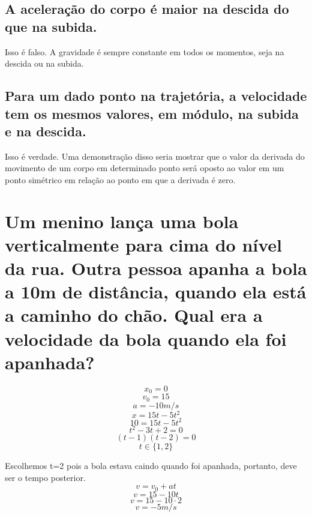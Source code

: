 \documentclass{article}
\begin{document}
    \subsection{A aceleração do corpo é maior na descida do que na subida.}
    \hspace{\parindent}Isso é falso. A gravidade é sempre constante em todos os momentos, seja na descida ou na subida.
    \subsection{Para um dado ponto na trajetória, a velocidade tem os mesmos valores, em módulo, na subida e na descida.}
    \hspace{\parindent}Isso é verdade. Uma demonstração disso seria mostrar que o valor da derivada do movimento de um corpo em determinado ponto será oposto ao valor em um ponto simétrico em relação ao ponto em que a derivada é zero.

\section{Um menino lança uma bola verticalmente para cima do nível da rua. Outra pessoa apanha a bola a 10m de distância, quando ela está a caminho do chão. Qual era a velocidade da bola quando ela foi apanhada?}
    \[x_0=0\]
    \[v_0=15\]
    \[a=-10m/s\]
    \[x=15t-5t^2\]
    \[10=15t-5t^2\]
    \[t^2-3t+2=0\]
    \[(t-1)(t-2)=0\]
    \[t\in\{1,2\}\]
    \par Escolhemos t=2 pois a bola estava caindo quando foi apanhada, portanto, deve ser o tempo posterior.
    \[v=v_0+at\]
    \[v=15-10t\]
    \[v=15-10\cdot 2\]
    \[v=-5m/s\]
    
\end{document}
